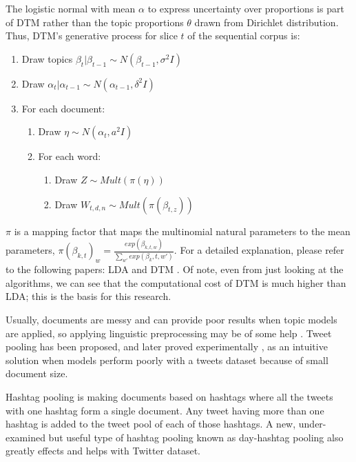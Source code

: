 The logistic normal with mean $ \alpha $ to express uncertainty over proportions is part of DTM rather than the topic proportions $\theta$ drawn from Dirichlet distribution. Thus, DTM's generative process for slice $t$ of the sequential corpus is:

\begin{enumerate}
\item Draw topics $ \beta_t | \beta_{t-1}  \sim N(\beta_{t-1}, \sigma^2I) $
\item Draw $ \alpha_t | \alpha_{t-1}  \sim N(\alpha_{t-1}, \delta^2I) $
\item For each document:
\begin{enumerate}
\item Draw $ \eta \sim N(\alpha_t, a^2I)$
\item For each word:
\begin{enumerate}
\item Draw $Z \sim Mult(\pi(\eta)) $
\item Draw $W_{t,d,n} \sim Mult(\pi(\beta_{t,z})) $
\end{enumerate}
\end{enumerate}
\end{enumerate}

$\pi$ is a mapping factor that maps the multinomial natural parameters to the mean parameters, $\pi(\beta_{k, t})_w = \frac{exp(\beta_{k,t,w})}{\sum_{w'} exp(\beta_k,t,w')}$. For a detailed explanation, please refer to the following papers: LDA \cite{blei2003latent} and DTM \cite{blei2006dynamic}. Of note, even from just looking at the algorithms, we can see that the computational cost of DTM is much higher than LDA; this is the basis for this research.

Usually, documents are messy and can provide poor results when topic models are applied, so applying linguistic preprocessing may be of some help \cite{han2012automatically}. Tweet pooling has been proposed, and later proved experimentally \cite{mehrotra2013improving}, as an intuitive solution \cite{hong2010empirical,zhao2011comparing} when models perform poorly with a tweets dataset because of small document size.

Hashtag pooling is making documents based on hashtags where all the tweets with one hashtag form a single document. Any tweet having more than one hashtag is added to the tweet pool of each of those hashtags.  A new, under-examined but useful type of hashtag pooling known as day-hashtag pooling also greatly effects and helps with Twitter dataset. 